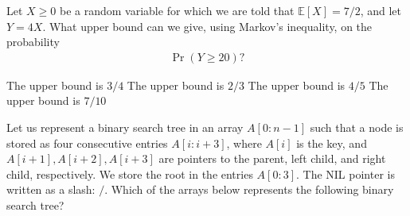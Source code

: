 Let \(X\geq 0\) be a random variable for which we are told that $\mathbb E[X]=7/2$, and let $Y=4X$.
What upper bound can we give, using Markov's inequality, on the probability
\begin{align*}
  \Pr(Y \geq 20 )?
\end{align*}
\oneanswer

\optionsstart
\answer The upper bound is \(3/4\)
\answer The upper bound is \(2/3\)
\answer The upper bound is \(4/5\)
\answer The upper bound is \(7/10\) \correct
\optionsend

\pageshift

Let us represent a binary search tree in an array \(A[0:n-1]\) such that a node is stored
as four consecutive entries \(A[i:i+3]\), where \(A[i]\) is the key,
and \(A[i+1], A[i+2], A[i+3]\) are pointers to the parent, left child, and right child, respectively.
We store the root in the entries \(A[0:3]\).
The NIL pointer is written as a slash: \(/\).
Which of the arrays below represents the following binary search tree?

\begin{center}
\end{center}
\oneanswer

